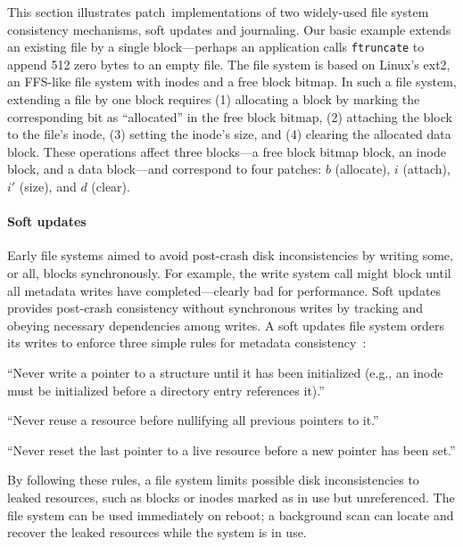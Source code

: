 \documentclass[9pt,twocolumn,letterpaper]{article}
\newcommand{\patch}{patch}
\begin{document}
This section illustrates \patch\ implementations of two widely-used
 file system consistency mechanisms, soft updates and journaling.
%
Our basic example extends an existing file by a single block---perhaps an
 application calls \texttt{ftruncate} to append 512 zero bytes to an
 empty file.
%
The file system is based on Linux's ext2, an FFS-like file system with inodes and
 a free block bitmap.
%
In such a file system, extending a file by one block requires (1) allocating a block by
 marking the corresponding bit as ``allocated'' in the free block bitmap,
 (2) attaching the block to the file's inode, (3) setting the inode's size,
 and (4) clearing the allocated data block.
%
These operations affect three blocks---a free block bitmap block, an inode
 block, and a data block---and correspond to four patches: $b$ (allocate),
 $i$ (attach), $i'$ (size), and $d$ (clear).


\paragraph{Soft updates}
%
Early file systems aimed to avoid post-crash disk inconsistencies by
 writing some, or all, blocks synchronously.
%
For example, the write system call might block until all metadata writes
 have completed---clearly bad for performance.
%
Soft updates provides post-crash consistency without
 synchronous writes by tracking and obeying necessary dependencies among
 writes.
%
A soft updates file system orders its writes to enforce three simple rules
 for metadata consistency~\cite{ganger00soft}:

\begin{compactenumerate}
\item \label{rule:pointer} ``Never write a pointer to a structure until it
 has been initialized (e.g., an inode must be initialized before a
 directory entry references it).''
\item \label{rule:reuse} ``Never reuse a resource before nullifying all
 previous pointers to it.''
\item \label{rule:overwrite} ``Never reset the last pointer to a live
 resource before a new pointer has been set.''
\end{compactenumerate}

\noindent
By following these rules, a file system limits possible disk inconsistencies
to leaked resources, such as blocks or inodes
marked as in use but unreferenced. The file system can be used immediately
 on reboot; a background scan can locate and recover the leaked resources
 while the system is in use.
\end{document}
